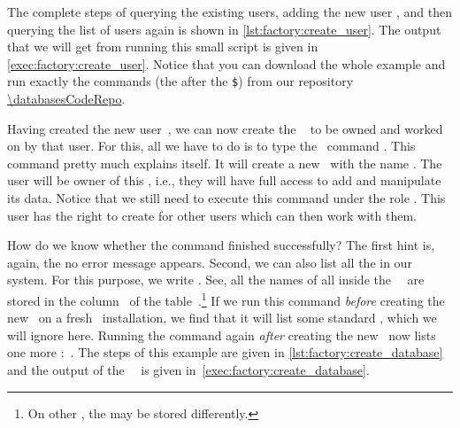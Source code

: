 The complete steps of querying the existing users, adding the new user , and then querying the list of users again is shown in \cref{lst:factory:create_user}.
The output that we will get from running this small script is given in \cref{exec:factory:create_user}.
Notice that you can download the whole example and run exactly the commands (the {\color{listing-tool-command}{red text}} after the {\color{listing-tool-command}\texttt{\$}}) from our repository \url{\databasesCodeRepo}.

%
%
\begin{sloppypar}%
Having created the new user~, we can now create the \db\  to be owned and worked on by that user.
For this, all we have to do is to type the \sql\ command .
This command pretty much explains itself.
It will create a new \db\ with the name .
The user  will be owner of this \db, i.e., they will have full access to add and manipulate its data.
Notice that we still need to execute this command under the  role .
This user has the right to create  for other users which can then work with them.%
\end{sloppypar}%
%
How do we know whether the command finished successfully?
The first hint is, again, the no error message appears.
Second, we can also list all the  in our system.
For this purpose, we write .
See, all the names of all  inside the \postgresql\ \dbms\ are stored in the column~ of the table~.\footnote{%
On other , the  may be stored differently.}
If we run this command \emph{before} creating the new \db\ on a fresh \postgresql\ installation, we find that it will list some standard , which we will ignore here.
Running the command again \emph{after} creating the new \db\ now lists one more \db:~.
The steps of this example are given in \cref{lst:factory:create_database} and the output of the \psql\ \client\ is given in~\cref{exec:factory:create_database}.%
%
\FloatBarrier%
\endhsection%
%

